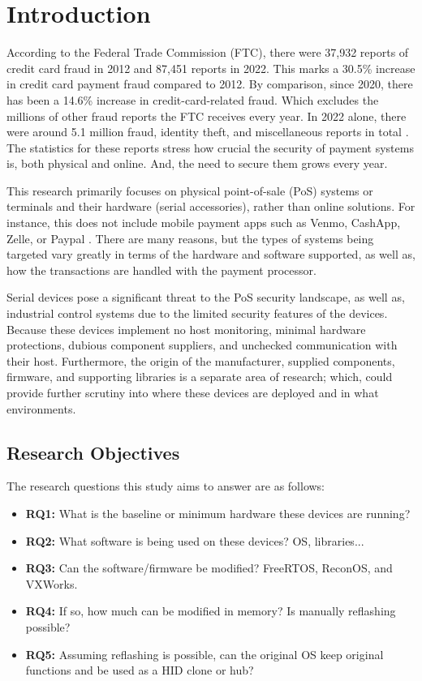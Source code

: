 \section{Introduction}

According to the Federal Trade Commission (FTC), there were 37,932 reports of credit card fraud in 2012 and 87,451 reports in 2022. This marks a 30.5\% increase in credit card payment fraud compared to 2012. By comparison, since 2020, there has been a 14.6\% increase in credit-card-related fraud. Which excludes the millions of other fraud reports the FTC receives every year. In 2022 alone, there were around 5.1 million fraud, identity theft, and miscellaneous reports in total \cite{forthesentinelConsumerSentinelNetwork2022,ConsumerSentinelNetwork2023}. The statistics for these reports stress how crucial the security of payment systems is, both physical and online. And, the need to secure them grows every year.

This research primarily focuses on physical point-of-sale (PoS) systems or terminals and their hardware (serial accessories), rather than online solutions. For instance, this does not include mobile payment apps such as Venmo, CashApp, Zelle, or Paypal \cite{wangMobilePaymentSecurity2016}. There are many reasons, but the types of systems being targeted vary greatly in terms of the hardware and software supported, as well as, how the transactions are handled with the payment processor.

Serial devices pose a significant threat to the PoS security landscape, as well as, industrial control systems due to the limited security features of the devices. Because these devices implement no host monitoring, minimal hardware protections, dubious component suppliers, and unchecked communication with their host. Furthermore, the origin of the manufacturer, supplied components, firmware, and supporting libraries is a separate area of research; which, could provide further scrutiny into where these devices are deployed and in what environments.

\subsection{Research Objectives}

The research questions this study aims to answer are as follows:

\begin{itemize}
  \item \textbf{RQ1:} What is the baseline or minimum hardware these devices are running?
  \item \textbf{RQ2:} What software is being used on these devices? OS, libraries...
  \item \textbf{RQ3:} Can the software/firmware be modified? FreeRTOS, ReconOS, and VXWorks.
  \item \textbf{RQ4:} If so, how much can be modified in memory? Is manually reflashing possible?
  \item \textbf{RQ5:} Assuming reflashing is possible, can the original OS keep original functions and be used as a HID clone or hub?
\end{itemize}

